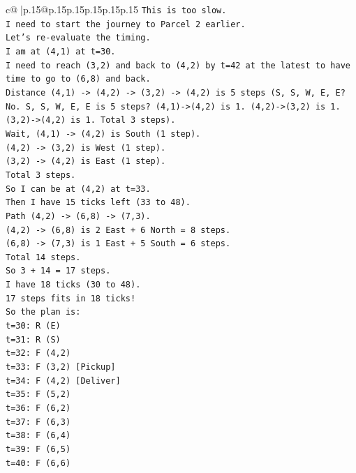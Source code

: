 \documentclass{article}
\begin{document}
{\begin{supertabular}{c@{$\;$}|p{.15\linewidth}@{}p{.15\linewidth}p{.15\linewidth}p{.15\linewidth}p{.15\linewidth}p{.15\linewidth}}
{{{\texttt{This is too slow.} \\
\texttt{I need to start the journey to Parcel 2 earlier.} \\
\texttt{Let's re{-}evaluate the timing.} \\
\texttt{I am at (4,1) at t=30.} \\
\texttt{I need to reach (3,2) and back to (4,2) by t=42 at the latest to have time to go to (6,8) and back.} \\
\texttt{Distance (4,1) {-}> (4,2) {-}> (3,2) {-}> (4,2) is 5 steps (S, S, W, E, E? No. S, S, W, E, E is 5 steps? (4,1){-}>(4,2) is 1. (4,2){-}>(3,2) is 1. (3,2){-}>(4,2) is 1. Total 3 steps).} \\
\texttt{Wait, (4,1) {-}> (4,2) is South (1 step).} \\
\texttt{(4,2) {-}> (3,2) is West (1 step).} \\
\texttt{(3,2) {-}> (4,2) is East (1 step).} \\
\texttt{Total 3 steps.} \\
\texttt{So I can be at (4,2) at t=33.} \\
\texttt{Then I have 15 ticks left (33 to 48).} \\
\texttt{Path (4,2) {-}> (6,8) {-}> (7,3).} \\
\texttt{(4,2) {-}> (6,8) is 2 East + 6 North = 8 steps.} \\
\texttt{(6,8) {-}> (7,3) is 1 East + 5 South = 6 steps.} \\
\texttt{Total 14 steps.} \\
\texttt{So 3 + 14 = 17 steps.} \\
\texttt{I have 18 ticks (30 to 48).} \\
\texttt{17 steps fits in 18 ticks!} \\
\texttt{So the plan is:} \\
\texttt{t=30: R (E)} \\
\texttt{t=31: R (S)} \\
\texttt{t=32: F (4,2)} \\
\texttt{t=33: F (3,2) {[}Pickup{]}} \\
\texttt{t=34: F (4,2) {[}Deliver{]}} \\
\texttt{t=35: F (5,2)} \\
\texttt{t=36: F (6,2)} \\
\texttt{t=37: F (6,3)} \\
\texttt{t=38: F (6,4)} \\
\texttt{t=39: F (6,5)} \\
\texttt{t=40: F (6,6)} \\
}}}
\end{supertabular}}
\end{document}
